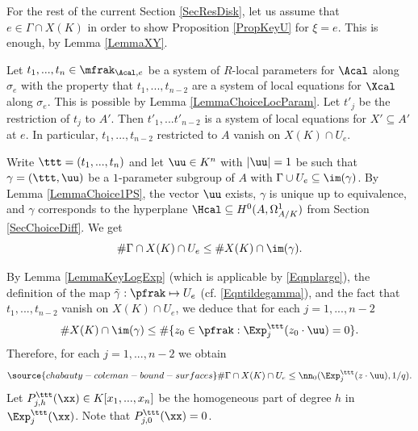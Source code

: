 For the rest of the current Section \ref{SecResDisk}, let us assume that $e\in \Gamma\cap X(K)$ in order to show Proposition \ref{PropKeyU} for $\xi=e$. This is enough, by Lemma \ref{LemmaXY}.

Let $t_1,...,t_n\in \mfrak_{\Acal, e}$ be a system of $R$-local parameters for $\Acal$ along $\sigma_e$ with the property that $t_1, ..., t_{n-2}$ are a system of local equations for $\Xcal$ along $\sigma_e$. This is possible by Lemma \ref{LemmaChoiceLocParam}. Let $t'_j$ be the restriction of $t_j$ to $A'$. Then $t'_1,...t'_{n-2}$ is a system of local equations for $X'\subseteq A'$ at $e$. In particular, $t_1,...,t_{n-2}$ restricted to $A$ vanish on $X(K)\cap U_e$.


Write $\ttt=(t_1,...,t_n)$ and let $\uu\in K^n$ with $|\uu |=1$ be such that $\gamma=(\ttt,\uu)$ be a $1$-parameter subgroup of $A$ with $\Gamma\cup U_e\subseteq \im(\gamma)$. By Lemma \ref{LemmaChoice1PS}, the vector $\uu$  exists, $\gamma$ is unique up to equivalence, and $\gamma$ corresponds to the hyperplane $\Hcal\subseteq H^0(A,\Omega^1_{A/K})$ from Section \ref{SecChoiceDiff}. We get
$$
\# \Gamma\cap X(K)\cap U_e \le \# X(K)\cap \im(\gamma).
$$

By Lemma \ref{LemmaKeyLogExp} (which is applicable by \eqref{Eqnplarge}), the definition of the map $\tilde{\gamma}:\pfrak\mapsto U_e$ (cf. \eqref{Eqntildegamma}), and the fact that $t_1,...,t_{n-2}$ vanish on $X(K)\cap U_e$, we deduce that for each $j=1,...,n-2$
$$
 \# X(K)\cap \im(\gamma)\le \#\{z_0\in \pfrak : \Exp_j^\ttt(z_0\cdot \uu)=0\}.
$$
Therefore, for each $j=1,..., n-2$ we obtain
\begin{equation}\label{EqnBdUn0}
\source{chabauty-coleman-bound-surfaces}
\# \Gamma\cap X(K)\cap U_e \le \nn_0(\Exp_j^\ttt(z\cdot \uu), 1/q).
\end{equation}
Let $P^\ttt_{j,h}(\xx)\in K[x_1,...,x_n]$ be the homogeneous part of degree $h$ in $\Exp_j^\ttt(\xx)$. Note that $P^\ttt_{j,0}(\xx)=0$.

